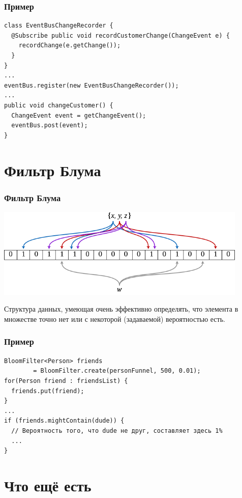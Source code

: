 \documentclass[xetex,mathserif,serif]{beamer}
\begin{document}
	\begin{frame}[fragile]
		\frametitle{Пример}
		\begin{verbatim}
class EventBusChangeRecorder {
  @Subscribe public void recordCustomerChange(ChangeEvent e) {
    recordChange(e.getChange());
  }
}
...
eventBus.register(new EventBusChangeRecorder());
...
public void changeCustomer() {
  ChangeEvent event = getChangeEvent();
  eventBus.post(event);
}
		\end{verbatim}
\end{frame}

	\section{Фильтр Блума}

	\begin{frame}
		\frametitle{Фильтр Блума}
		\begin{center}
			\includegraphics[width=0.9\textwidth]{bloomFilter.png}
		\end{center}

		Структура данных, умеющая очень эффективно определять, что элемента в множестве точно нет или с некоторой (задаваемой) вероятностью есть.
	\end{frame}

	\begin{frame}[fragile]
		\frametitle{Пример}
		\begin{verbatim}
BloomFilter<Person> friends 
        = BloomFilter.create(personFunnel, 500, 0.01);
for(Person friend : friendsList) {
  friends.put(friend);
}
...
if (friends.mightContain(dude)) {
  // Вероятность того, что dude не друг, составляет здесь 1%
  ...
}
		\end{verbatim}
\end{frame}

	\section{Что ещё есть}
\end{document}

